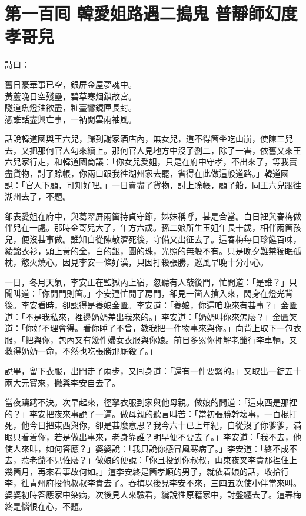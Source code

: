 
\chapter*{第一百囘 韓愛姐路遇二搗鬼 普靜師幻度孝哥兒}


詩曰：

\begin{myquote}
舊日豪華事已空，銀屏金屋夢魂中。\\黃蘆晚日空殘壘，碧草寒烟鎖故宮。\\隧道魚燈油欲盡，粧臺鸞鏡匣長封。\\憑誰話盡興亡事，一衲閒雲兩袖風。
\end{myquote}

話說韓道國與王六兒，歸到謝家酒店內，無女兒，道不得箇坐吃山崩，使陳三兒去，又把那何官人勾來續上。那何官人見地方中沒了劉二，除了一害，依舊又來王六兒家行走，和韓道國商議：「你女兒愛姐，只是在府中守孝，不出來了，等我賣盡貨物，討了賒帳，你兩口跟我徃湖州家去罷，省得在此做這般道路。」韓道國說：「官人下顧，可知好哩。」{}一日賣盡了貨物，討上賒帳，顧了船，同王六兒跟徃湖州去了，不題。

卻表愛姐在府中，與葛翠屏兩箇持貞守節，姊妹稱呼，甚是合當。白日裡與春梅做伴兒在一處。那時金哥兒大了，年方六歲。孫二娘所生玉姐年長十歲，相伴兩箇孩兒，便沒甚事做。誰知自從陳敬濟死後，守備又出征去了。這春梅每日珍饈百味，綾錦衣衫，頭上黃的金，白的銀，圓的珠，光照的無般不有。只是晚夕難禁獨眠孤枕，慾火燒心。{}因見李安一條好漢，只因打殺張勝，巡風早晚十分小心。

一日，冬月天氣，李安正在監獄內上宿，忽聽有人敲後門，忙問道：「是誰？」只聞叫道：「你開門則箇。」李安連忙開了房門，卻見一箇人搶入來，閃身在燈光背後。李安看時，卻認得是養娘金匱。李安道：「養娘，你這咱晚來有甚事？」金匱道：「不是我私來，裡邊奶奶差出我來的。」李安道：「奶奶叫你來怎麼？」金匱笑道：「你好不理會得。看你睡了不曾，教我把一件物事來與你。」向背上取下一包衣服，「把與你，包內又有幾件婦女衣服與你娘。前日多累你押解老爺行李車輛，又救得奶奶一命，不然也吃張勝那厮殺了。」

說畢，留下衣服，出門走了兩步，又囘身道：「還有一件要緊的。」又取出一錠五十兩大元寶來，撇與李安自去了。

當夜躊躇不決。次早起來，徑拏衣服到家與他母親。做娘的問道：「這東西是那裡的？」李安把夜來事說了一遍。做母親的聽言叫苦：「當初張勝幹壞事，一百棍打死，他今日把東西與你，卻是甚麼意思？我今六十已上年紀，自從沒了你爹爹，滿眼只看着你，若是做出事來，老身靠誰？明早便不要去了。」{}李安道：「我不去，他使人來叫，如何答應？」婆婆說：「我只說你感冒風寒病了。」李安道：「終不成不去，惹老爺不見恠麼？」做娘的便說：「你且投到你叔叔，山東夜叉李貴那裡住上幾箇月，再來看事故何如。」這李安終是箇孝順的男子，就依着娘的話，收拾行李，徃青州府投他叔叔李貴去了。春梅以後見李安不來，三四五次使小伴當來叫。婆婆初時答應家中染病，次後見人來驗看，纔說徃原籍家中，討盤纏去了。這春梅終是惱恨在心，不題。

